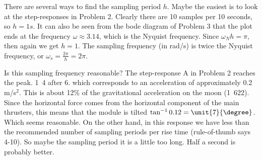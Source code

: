 \documentclass[letter,11pt]{scrartcl}
\begin{document}
There are several ways to find the sampling period $h$. Maybe the easiest is to look at the step-responses in Problem 2. Clearly there are 10 samples per 10 seconds, so $h=\unit{1}{s}$. It can also be seen from the bode diagram of Problem 3 that the plot ends at the frequency $\omega \approx 3.14$, which is the Nyquist frequency. Since $\omega_N h = \pi$, then again we get $h=1$. The sampling frequency (in rad/s) is twice the Nyquist frequency, or $\omega_s = \frac{2\pi}{h} = 2\pi$. 

Is this sampling frequency reasonable? The step-response A in Problem 2 reaches the peak. \unit{1.4}{\meter\per\second} after \unit{6}{\second}. 
which corresponds to an acceleration of approximately 0.2 m/s$^2$.%
This is about 12\% of the gravitational acceleration on the moon
(\unit{1.622}{\meter\per\second\squared}). 
Since the horizontal force comes from the horizontal component of the main thrusters, this means that the module is tilted $\tan^{-1} 0.12 = \unit{7}{\degree}$. Which seems reasonable. On the other hand, in this response we have less than the recommended number of sampling periods per rise time (rule-of-thumb says 4-10). So maybe the sampling period it is a little too long. Half a second is probably better. 
\end{document}
